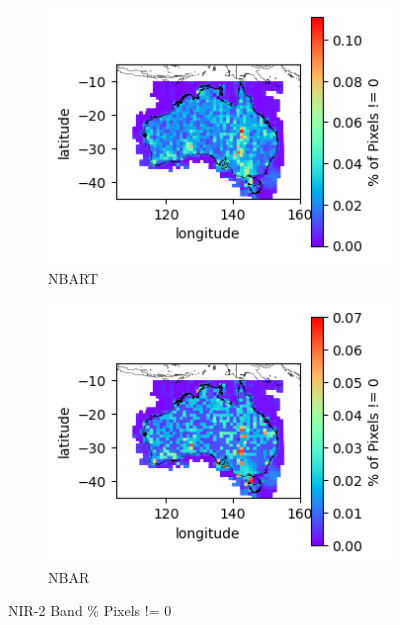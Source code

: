 \documentclass[a4paper]{article}
\begin{document}
      \begin{figure}[h!]
        \centering
          \begin{subfigure}[l]{.4\linewidth}
            \hspace{-32mm}
            \includegraphics[scale=0.9]{plots/nbart/nbart_nir_2-PercentDifferent.png}
            \caption{NBART}
          \end{subfigure}
%
          \begin{subfigure}[r]{.4\linewidth}
            \includegraphics[scale=0.9]{plots/nbar/nbar_nir_2-PercentDifferent.png}
            \caption{NBAR}
          \end{subfigure}
        \caption{NIR-2 Band \% Pixels != 0}\label{figure:31}
      \end{figure}
\end{document}
